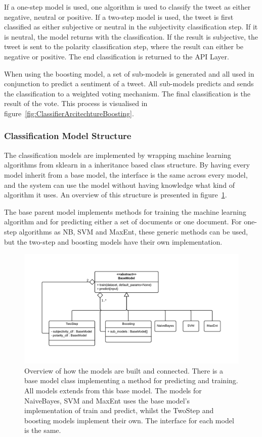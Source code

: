 If a one-step model is used, one algorithm is used to classify the tweet as either negative, neutral or positive. If a two-step model is used, the tweet is first classified as either subjective or neutral in the subjectivity classification step. If it is neutral, the model returns with the classification. If the result is subjective, the tweet is sent to the polarity classification step, where the result can either be negative or positive. The end classification is returned to the API Layer.

When using the boosting model, a set of sub-models is generated and all used in conjunction to predict a sentiment of a tweet. All sub-models predicts and sends the classification to a weighted voting mechanism. The final classification is the result of the vote. This process is visualised in figure~\ref{fig:ClassifierArcitechtureBoosting}.

\subsubsection{Classification Model Structure}

The classification models are implemented by wrapping machine learning algorithms from sklearn in a inheritance based class structure. By having every model inherit from a base model, the interface is the same across every model, and the system can use the model without having knowledge what kind of algorithm it uses. An overview of this structure is presented in figure~\ref{fig:ModelsStructure}.

The base parent model implements methods for training the machine learning algorithm and for predicting either a set of documents or one document. For one-step algorithms as NB, SVM and MaxEnt, these generic methods can be used, but the two-step and boosting models have their own implementation. 
 
\begin{figure}[!ht]
 \begin{center}
     \includegraphics[width=\textwidth]{../img/ModelsStructure.pdf}
 \end{center}
 \caption[Classification Model Structure Overview]{Overview of how the models are built and connected. There is a base model class implementing a method for predicting and training. All models extends from this base model. The models for NaiveBayes, SVM and MaxEnt uses the base model's implementation of train and predict, whilst the TwoStep and boosting models implement their own. The interface for each model is the same.}
 \label{fig:ModelsStructure}
\end{figure}


